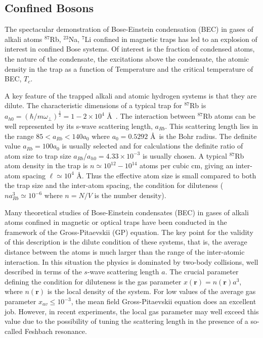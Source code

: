 \documentclass[twoside,english]{uiofysmaster}
\begin{document}
\subsection{Confined Bosons}

The spectacular demonstration of Bose-Einstein condensation (BEC) in gases of
 alkali atoms $^{87}$Rb, $^{23}$Na, $^7$Li confined in magnetic
 traps has led to an explosion of interest in
 confined Bose systems. Of interest is the fraction of condensed atoms, the
 nature of the condensate, the excitations above the condensate, the atomic
 density in the trap as a function of Temperature and the critical temperature of BEC,
 $T_c$. \cite{Dubois2001} \cite{Nilsen2005}

 A key feature of the trapped alkali and atomic hydrogen systems is that they are
 dilute. The characteristic dimensions of a typical trap for $^{87}$Rb is
 $a_{h0}=\left( {\hbar}/{m\omega_\perp}\right)^\frac{1}{2}=1-2 \times 10^4$
 \AA\ . The interaction between $^{87}$Rb atoms can be well represented
 by its s-wave scattering length, $a_{Rb}$. This scattering length lies in the
 range $85 < a_{Rb} < 140 a_0$ where $a_0 = 0.5292$ \AA\ is the Bohr radius.
 The definite value $a_{Rb} = 100 a_0$ is usually selected and
 for calculations the definite ratio of atom size to trap size 
 $a_{Rb}/a_{h0} = 4.33 \times 10^{-3}$ 
 is usually chosen. A typical $^{87}$Rb atom
 density in the trap is $n \simeq 10^{12}- 10^{14}$ atoms per cubic cm, giving an
 inter-atom spacing $\ell \simeq 10^4$ \AA. Thus the effective atom size is small
 compared to both the trap size and the inter-atom spacing, the condition
 for diluteness ($na^3_{Rb} \simeq 10^{-6}$ where $n = N/V$ is the number
 density). 

Many theoretical studies of Bose-Einstein condensates (BEC) in gases
of alkali atoms confined in magnetic or optical traps have been
conducted in the framework of the Gross-Pitaevskii (GP) equation.  The
key point for the validity of this description is the dilute condition
of these systems, that is, the average distance between the atoms is
much larger than the range of the inter-atomic interaction. In this
situation the physics is dominated by two-body collisions, well
described in terms of the $s$-wave scattering length $a$. 
The crucial
parameter defining the condition for diluteness is the gas parameter
$x(\mathbf{r})= n(\mathbf{r}) a^3$, where $n(\mathbf{r})$ is the local density
of the system. For low values of the average gas parameter $x_{av}\le 10^{-3}$, the mean field Gross-Pitaevskii equation does an excellent
job.  However,
in recent experiments, the local gas parameter may well exceed this
value due to the possibility of tuning the scattering length in the
presence of a so-called Feshbach resonance.
\end{document}
